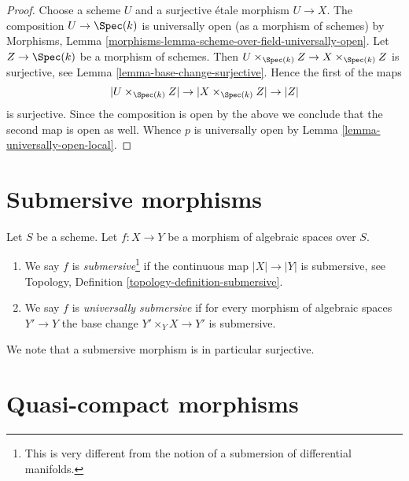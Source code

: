 \begin{proof}
Choose a scheme $U$ and a surjective \'etale morphism $U \to X$.
The composition $U \to \Spec(k)$ is universally open (as a morphism
of schemes) by
Morphisms, Lemma \ref{morphisms-lemma-scheme-over-field-universally-open}.
Let $Z \to \Spec(k)$ be a morphism of schemes. Then
$U \times_{\Spec(k)} Z \to X \times_{\Spec(k)} Z$ is surjective,
see
Lemma \ref{lemma-base-change-surjective}.
Hence the first of the maps
$$
|U \times_{\Spec(k)} Z| \to |X \times_{\Spec(k)} Z| \to |Z|
$$
is surjective. Since the composition is open by the above we conclude that
the second map is open as well. Whence $p$ is universally open by
Lemma \ref{lemma-universally-open-local}.
\end{proof}








\section{Submersive morphisms}
\label{section-submersive}

\begin{definition}
\label{definition-submersive}
Let $S$ be a scheme.
Let $f : X \to Y$ be a morphism of algebraic spaces over $S$.
\begin{enumerate}
\item We say $f$ is {\it submersive}\footnote{This is very different
from the notion of a submersion of differential manifolds.}
if the continuous map $|X| \to |Y|$ is submersive, see
Topology, Definition \ref{topology-definition-submersive}.
\item We say $f$ is {\it universally submersive} if for every
morphism of algebraic spaces $Y' \to Y$ the base change
$Y' \times_Y X \to Y'$ is submersive.
\end{enumerate}
\end{definition}

\noindent
We note that a submersive morphism is in particular surjective.












\section{Quasi-compact morphisms}
\label{section-quasi-compact}

